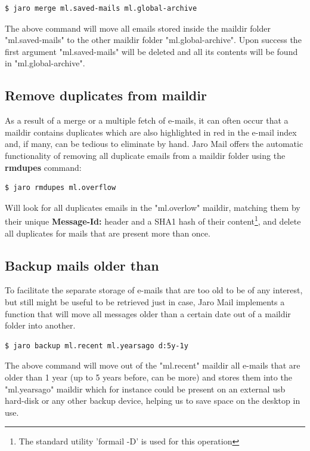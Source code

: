 \documentclass[a4,onecolumn,portrait]{article}
\begin{document}
\begin{verbatim}
$ jaro merge ml.saved-mails ml.global-archive
\end{verbatim}

The above command will move all emails stored inside the maildir
folder "ml.saved-mails" to the other maildir folder
"ml.global-archive". Upon success the first argument "ml.saved-mails"
will be deleted and all its contents will be found in
"ml.global-archive".

\subsection{Remove duplicates from maildir}
\label{sec-9-2}

As a result of a merge or a multiple fetch of e-mails, it can often
occur that a maildir contains duplicates which are also highlighted in
red in the e-mail index and, if many, can be tedious to eliminate by
hand. Jaro Mail offers the automatic functionality of removing all
duplicate emails from a maildir folder using the \textbf{rmdupes} command:

\begin{verbatim}
$ jaro rmdupes ml.overflow
\end{verbatim}

Will look for all duplicates emails in the "ml.overlow" maildir,
matching them by their unique \textbf{Message-Id:} header and a SHA1 hash of
their content\footnote{The standard utility 'formail -D' is used for this operation}, and delete all duplicates for mails that
are present more than once.
\subsection{Backup mails older than}
\label{sec-9-3}

To facilitate the separate storage of e-mails that are too old to be
of any interest, but still might be useful to be retrieved just in
case, Jaro Mail implements a function that will move all messages
older than a certain date out of a maildir folder into another.

\begin{verbatim}
$ jaro backup ml.recent ml.yearsago d:5y-1y
\end{verbatim}

The above command will move out of the "ml.recent" maildir all e-mails
that are older than 1 year (up to 5 years before, can be more) and
stores them into the "ml.yearsago" maildir which for instance could be
present on an external usb hard-disk or any other backup device,
helping us to save space on the desktop in use.
\end{document}
